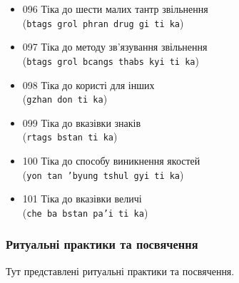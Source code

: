 \documentclass{article}
\begin{document}
\begin{itemize}
\item 096 Тіка до шести малих тантр звільнення \\ (\texttt{btags grol phran drug gi ti ka})
\item 097 Тіка до методу зв'язування звільнення \\ (\texttt{btags grol bcangs thabs kyi ti ka})
\item 098 Тіка до користі для інших \\ (\texttt{gzhan don ti ka})
\item 099 Тіка до вказівки знаків \\ (\texttt{rtags bstan ti ka})
\item 100 Тіка до способу виникнення якостей \\ (\texttt{yon tan 'byung tshul gyi ti ka})
\item 101 Тіка до вказівки величі \\ (\texttt{che ba bstan pa'i ti ka})
\end{itemize}
\endgroup

\subsubsection{Ритуальні практики та посвячення}

Тут представлені ритуальні практики та посвячення.
\end{document}
